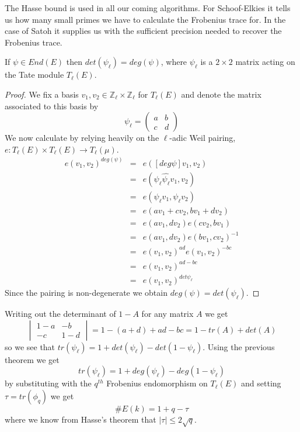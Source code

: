 The Hasse bound is used in all our coming algorithms. For Schoof-Elkies it tells us how many
small primes we have to calculate the Frobenius trace for. In the case of Satoh it supplies us
with the sufficient precision needed to recover the Frobenius trace.

\begin{prop} 
 If $\psi \in End(E)$ then $det(\psi_\ell) = deg(\psi)$, where $\psi_\ell$ is a $2\times2$ matrix acting
on the Tate module $T_\ell(E)$.
\label{detdeg}
\end{prop}
\begin{proof}
 We fix a basis $v_1,v_2 \in \mathbb{Z}_\ell \times \mathbb{Z}_\ell$ for $T_\ell(E)$ and denote the matrix
associated to this basis by
$$ \psi_\ell = \begin{pmatrix} a & b \\ c & d \end{pmatrix} $$
We now calculate by relying heavily on the $\ell$-adic Weil pairing,
$e: T_\ell(E) \times T_\ell(E) \rightarrow T_\ell(\mu)$.
\begin{eqnarray}
 e(v_1, v_2)^{deg(\psi)} &=& e([deg \psi]v_1, v_2) \nonumber \\
			 &=& e(\psi_\ell \widehat{\psi_\ell} v_1, v_2) \nonumber \\
			 &=& e(\psi_\ell v_1, \psi_\ell v_2) \nonumber \\
			 &=& e(a v_1 + c v_2, b v_1 + d v_2) \nonumber \\
			 &=& e(a v_1, d v_2) e(c v_2, b v_1) \nonumber \\
			 &=& e(a v_1, d v_2) e(b v_1, c v_2)^{-1} \nonumber \\
			 &=& e(v_1, v_2)^{ad} e(v_1, v_2)^{-bc} \nonumber \\
			 &=& e(v_1, v_2)^{ad - bc} \nonumber \\
			 &=& e(v_1, v_2)^{det \psi_\ell} \nonumber
\end{eqnarray}
Since the pairing is non-degenerate we obtain $deg(\psi) = det(\psi_\ell)$.
\end{proof}

Writing out the determinant of $1-A$ for any matrix $A$ we get
$$ \begin{vmatrix} 1-a & -b \\ -c & 1-d \end{vmatrix} = 1-(a+d)+ad-bc = 1-tr(A)+det(A) $$
so we see that $tr(\psi_\ell) = 1 + det(\psi_\ell) - det(1-\psi_\ell)$. Using the previous theorem we
get $$tr(\psi_\ell) = 1 + deg(\psi_\ell) - deg(1-\psi_\ell)$$ by substituting with the $q^{th}$ 
Frobenius endomorphism on $T_\ell(E)$ and setting $\tau = tr(\phi_q)$ we get
$$\#E(k) = 1 + q - \tau$$
where we know from Hasse's theorem that $\lvert \tau \rvert \leq 2\sqrt{q}$.

